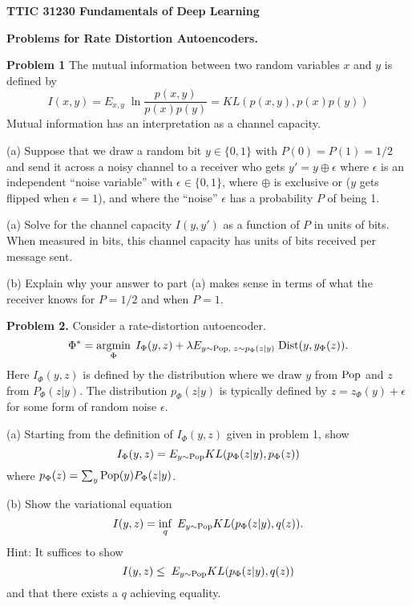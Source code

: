 \documentclass{article}
\begin{document}
\centerline{\bf TTIC 31230 Fundamentals of Deep Learning}

\bigskip

\centerline{\bf Problems for Rate Distortion Autoencoders.}

\bigskip
\bigskip

{\bf Problem 1}
The mutual information between two random variables $x$ and $y$ is defined by
$$I(x,y) = E_{x,y}\;\ln\frac{p(x,y)}{p(x)p(y)} = KL(p(x,y),p(x)p(y))$$
Mutual information has an interpretation as a channel capacity.

\medskip(a)
Suppose that
we draw a random bit $y \in \{0,1\}$ with $P(0) = P(1) = 1/2$ and send it across a noisy channel
to a receiver who gets $y' = y \oplus \epsilon$ where $\epsilon$ is an independent ``noise variable'' with $\epsilon \in\{0,1\}$, where
$\oplus$ is exclusive or ($y$ gets flipped when $\epsilon = 1$),
and where the ``noise'' $\epsilon$ has a probability $P$ of being 1.

\medskip(a) Solve for the channel capacity $I(y,y')$ as a function of $P$ in units of bits.
When measured in bits, this channel capacity has units of bits received per message sent.

\medskip
(b) Explain why your answer to part (a) makes sense in terms of what the receiver knows for $P = 1/2$ and when $P=1$.

\bigskip
{\bf Problem 2.}
Consider a rate-distortion autoencoder.
$$\Phi^* = \operatorname*{argmin}_\Phi\;I_\Phi(y,z) + \lambda E_{y \sim \mathrm{Pop},\;z \sim p_\Phi(z|y)}\;\mathrm{Dist}(y,y_\Phi(z)).$$
Here $I_\Phi(y,z)$ is defined by the distribution where we draw $y$ from $\mathrm{Pop}$ and $z$ from $P_\Phi(z|y)$.  The distribution
$p_\Phi(z|y)$ is typically defined by $z = z_\Phi(y) + \epsilon$ for some form of random noise $\epsilon$.

\medskip
(a) Starting from the definition of $I_\Phi(y,z)$ given in problem 1, show
$$I_\Phi(y,z) = E_{y\sim \mathrm{Pop}} KL(p_\Phi(z|y),p_\Phi(z))$$
where $p_\Phi(z) = \sum_y \mathrm{Pop}(y)P_\Phi(z|y)$.

\medskip
(b) Show the variational equation
$$I(y,z) = \inf_q\;E_{y\sim \mathrm{Pop}} KL(p_\Phi(z|y),q(z)).$$
Hint: It suffices to show $$I(y,z) \leq \;E_{y\sim \mathrm{Pop}} KL(p_\Phi(z|y),q(z))$$
and that there exists a $q$ achieving equality.
\end{document}
